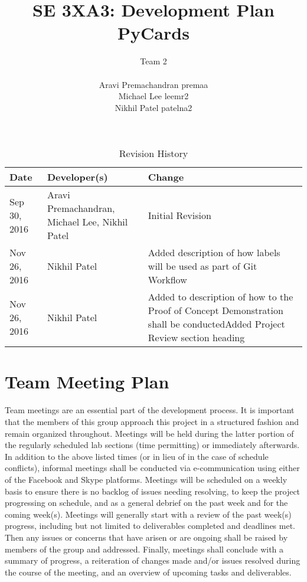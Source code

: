 \documentclass{article}
\title{SE 3XA3: Development Plan\\PyCards}
\author{Team 2 \\ \\ Aravi Premachandran premaa \\ Michael Lee leemr2
\\ Nikhil Patel patelna2 }
\date{}
\begin{document}
\maketitle

\begin{table}[hp]
\caption{Revision History} \label{TblRevisionHistory}
\begin{tabularx}{\textwidth}{llX}
\toprule
\textbf{Date} & \textbf{Developer(s)}& \textbf{Change}\\
\midrule
Sep 30, 2016 & Aravi Premachandran, Michael Lee, Nikhil Patel
& Initial Revision\\ 
Nov 26, 2016 & Nikhil Patel
& Added description of how labels will be used as part of Git Workflow\\ 
Nov 26, 2016 & Nikhil Patel
& Added to description of how to the Proof of Concept Demonstration
shall be conducted\newline Added Project Review section heading\\ 
\bottomrule
\end{tabularx}
\end{table}

\section{Team Meeting Plan}

\indent Team meetings are an essential part of the development process. It is
important that the members of this group approach this project in a structured
fashion and remain organized throughout. Meetings will be held during the latter
portion of the regularly scheduled lab sections (time permitting) or immediately
afterwards. In addition to the above listed times (or in lieu of in the case of
schedule conflicts), informal meetings shall be conducted via e-communication
using either of the Facebook and Skype platforms.
\newline \indent Meetings will be scheduled on a weekly basis to ensure there
is no backlog of issues needing resolving, to keep the project progressing on
schedule, and as a general debrief on the past week and for the coming week(s).
Meetings will generally start with a review of the past week(s) progress,
including but not limited to deliverables completed and deadlines met. Then any
issues or concerns that have arisen or are ongoing shall be raised by members
of the group and addressed. Finally, meetings shall conclude with a summary of
progress, a reiteration of changes made and/or issues resolved during the
course of the meeting, and an overview of upcoming tasks and deliverables.
\end{document}
